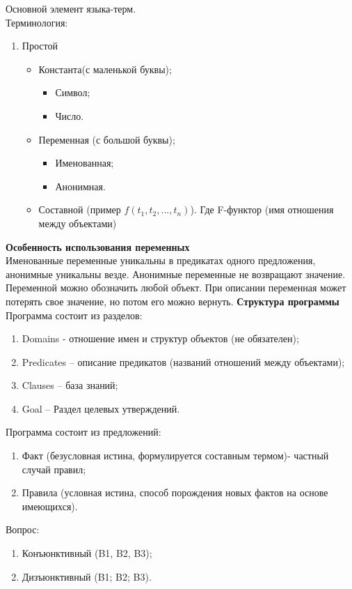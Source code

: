 \documentclass[a4paper, 12pt]{article}
\begin{document}
Основной элемент языка-терм.
\\ Терминология:
\begin{enumerate}
	\item Простой
	\begin{itemize}
		\item Константа(с маленькой буквы);
		\begin{itemize}
			\item Символ;
			\item Число.
		\end{itemize}
		\item Переменная (с большой буквы);
		\begin{itemize}
			\item Именованная;
			\item Анонимная.
		\end{itemize}
		\item Составной (пример $f(t_1, t_2,..., t_n)$). Где F-функтор (имя отношения между объектами)
	\end{itemize}
\end{enumerate}

\textbf{Особенность использования переменных}
\\ \hspace*{5mm} Именованные переменные уникальны в предикатах одного предложения, анонимные уникальны везде. Анонимные переменные не возвращают значение. Переменной можно обозначить любой объект. При описании переменная может потерять свое значение, но потом его можно вернуть.
\textbf{Структура программы}
Программа состоит из разделов:
\begin{enumerate}
	\item Domains - отношение имен и структур объектов (не обязателен);
	\item Predicates – описание предикатов (названий отношений между объектами);
	\item Clauses – база знаний;
	\item Goal – Раздел целевых утверждений.
\end{enumerate}
Программа состоит из предложений:
\begin{enumerate}
	\item Факт (безусловная истина, формулируется составным термом)- частный случай правил;
	\item Правила (условная истина, способ порождения новых фактов на основе имеющихся).
\end{enumerate}

Вопрос:
\begin{enumerate}
	\item Конъюнктивный (B1, B2, B3);
	\item Дизъюнктивный (B1; B2; B3).
\end{enumerate}
\end{document}
